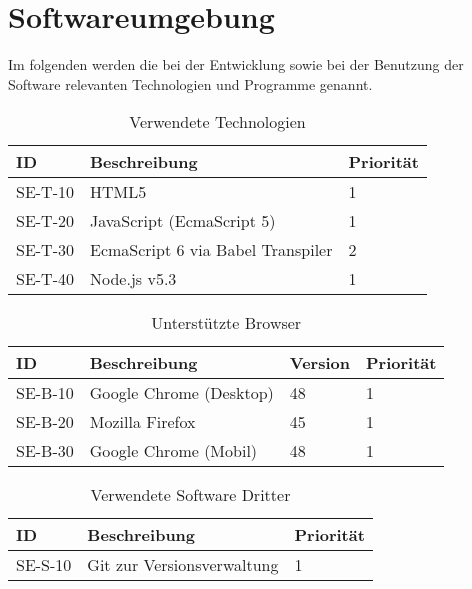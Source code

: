 
\chapter{Softwareumgebung}
Im folgenden werden die bei der Entwicklung sowie bei der Benutzung der Software relevanten Technologien und Programme genannt.

\begin{table}[H]
\caption{Verwendete Technologien}
\label{softwareumgebung:technologien}
\begin{tabularx}{\textwidth}{|l|X|l|}
\toprule
\textbf{ID} & \textbf{Beschreibung} & \textbf{Priorität}\\
\endhead
\hline
SE-T-10 & HTML5 & 1 \\
SE-T-20 & JavaScript (EcmaScript 5) & 1 \\
SE-T-30 & EcmaScript 6 via Babel Transpiler & 2 \\
SE-T-40 & Node.js v5.3 & 1 \\
\hline
\end{tabularx}
\end{table}

\begin{table}[H]
\caption{Unterstützte Browser}
\label{softwareumgebung:browser}
\begin{tabularx}{\textwidth}{|l|l|l|l|}
\toprule
\textbf{ID} & \textbf{Beschreibung} & \textbf{Version} & \textbf{Priorität}\\
\endhead
\hline
SE-B-10 & Google Chrome (Desktop) & 48 & 1 \\
SE-B-20 & Mozilla Firefox & 45 & 1 \\
SE-B-30 & Google Chrome (Mobil) & 48 & 1\\
\hline
\end{tabularx}
\end{table}

\begin{table}[H]
\caption{Verwendete Software Dritter}
\label{softwareumgebung:sonstige}
\begin{tabularx}{\textwidth}{|l|X|l|}
\toprule
\textbf{ID} & \textbf{Beschreibung} & \textbf{Priorität}\\
\endhead
\hline
SE-S-10 & Git zur Versionsverwaltung & 1 \\
\hline
\end{tabularx}
\end{table}
